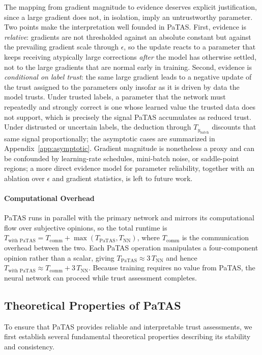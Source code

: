 The mapping from gradient magnitude to evidence deserves explicit justification, since a large gradient does not, in isolation, imply an untrustworthy parameter. Two points make the interpretation well founded in PaTAS. First, evidence is \emph{relative}: gradients are not thresholded against an absolute constant but against the prevailing gradient scale through $\epsilon$, so the update reacts to a parameter that keeps receiving atypically large corrections \emph{after} the model has otherwise settled, not to the large gradients that are normal early in training. Second, evidence is \emph{conditional on label trust}: the same large gradient leads to a negative update of the trust assigned to the parameters only insofar as it is driven by data the model trusts. Under trusted labels, a parameter that the network must repeatedly and strongly correct is one whose learned value the trusted data does not support, which is precisely the signal PaTAS accumulates as reduced trust. Under distrusted or uncertain labels, the deduction through $T_{y_\text{batch}}$ discounts that same signal proportionally; the asymptotic cases are summarized in Appendix~\ref{app:asymptotic}. Gradient magnitude is nonetheless a proxy and can be confounded by learning-rate schedules, mini-batch noise, or saddle-point regions; a more direct evidence model for parameter reliability, together with an ablation over $\epsilon$ and gradient statistics, is left to future work.

\paragraph*{Computational Overhead}
PaTAS runs in parallel with the primary network and mirrors its computational flow over subjective opinions, so the total runtime is \(T_{\text{with PaTAS}} = T_{\text{comm}} + \max(T_{\text{PaTAS}}, T_{\text{NN}})\), where \(T_{\text{comm}}\) is the communication overhead between the two. Each PaTAS operation manipulates a four-component opinion rather than a scalar, giving \(T_{\text{PaTAS}} \approx 3\,T_{\text{NN}}\) and hence \(T_{\text{with PaTAS}} \approx T_{\text{comm}} + 3\,T_{\text{NN}}\). Because training requires no value from PaTAS, the neural network can proceed while trust assessment completes.

\vspace{-0.5em}
\subsection{Theoretical Properties of PaTAS}\label{sec:ptastheory}
To ensure that PaTAS provides reliable and interpretable trust assessments, we first establish several fundamental theoretical properties describing its stability and consistency.
